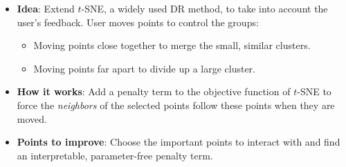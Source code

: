 \documentclass[portrait,final,a0paper]{nadiposter}
\newcommand{\compresslist}{%
\setlength{\itemsep}{1pt}%
\setlength{\parskip}{0pt}%
\setlength{\parsep}{0pt}%
\setlength{\leftmargin}{0pt}%
}
\begin{document}
\begin{poster}
{\begin{minipage}{0.52\linewidth}
\noindent
\begin{itemize}
    \item \textbf{Idea}: Extend $t$-SNE, a widely used DR method, to take into account the user's feedback. User moves points to control the groups:
    \noindent
    \begin{itemize}
        \item Moving points close together to merge the small, similar clusters. \small{\color{blue}{(a)}}
        \item Moving points far apart to divide up a large cluster. \small{\color{blue}{(b)}}
    \end{itemize}
\end{itemize}
\end{minipage}
\begin{minipage}{0.44\linewidth}
\noindent
\begin{itemize}
    \item \textbf{How it works}: Add a {\color{red} penalty term} to the objective function of $t$-SNE to force the \emph{neighbors} of the selected points follow these points when they are moved.
    \item \textbf{Points to improve}: Choose the important points to interact with and find an interpretable, parameter-free penalty term.
\end{itemize}
\end{minipage}
}



\end{poster}
\end{document}
